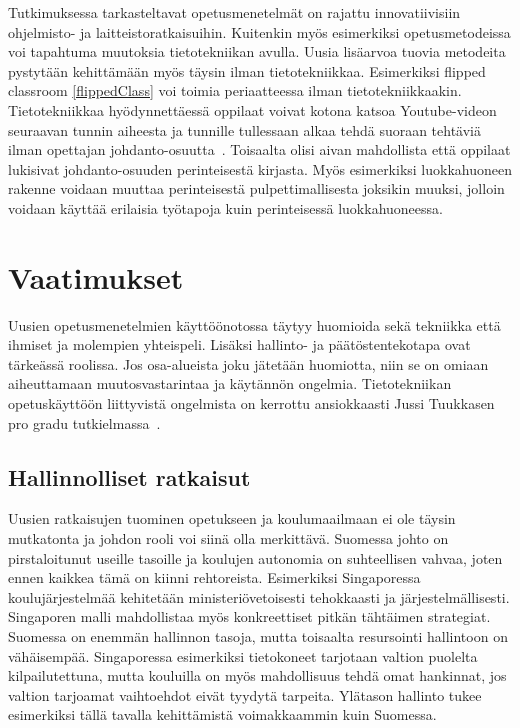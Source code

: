 \documentclass[utf8,bachelor]{gradu3}
\begin{document}
Tutkimuksessa tarkasteltavat opetusmenetelmät on rajattu innovatiivisiin ohjelmisto- ja laitteistoratkaisuihin. Kuitenkin myös esimerkiksi opetusmetodeissa voi tapahtuma muutoksia tietotekniikan avulla. Uusia lisäarvoa tuovia metodeita pystytään kehittämään myös täysin ilman tietotekniikkaa. Esimerkiksi flipped classroom \ref{flippedClass} voi toimia periaatteessa ilman tietotekniikkaakin. Tietotekniikkaa hyödynnettäessä oppilaat voivat kotona katsoa Youtube-videon seuraavan tunnin aiheesta ja tunnille tullessaan alkaa tehdä suoraan tehtäviä ilman opettajan johdanto-osuutta~\parencite[][]{flipped}. Toisaalta olisi aivan mahdollista että oppilaat lukisivat johdanto-osuuden perinteisestä kirjasta. Myös esimerkiksi luokkahuoneen rakenne voidaan muuttaa perinteisestä pulpettimallisesta joksikin muuksi, jolloin voidaan käyttää erilaisia työtapoja kuin perinteisessä luokkahuoneessa.

\section{Vaatimukset}
Uusien opetusmenetelmien käyttöönotossa täytyy huomioida sekä tekniikka että ihmiset ja molempien yhteispeli. Lisäksi hallinto- ja päätöstentekotapa ovat tärkeässä roolissa. Jos osa-alueista joku jätetään huomiotta, niin se on omiaan aiheuttamaan muutosvastarintaa ja käytännön ongelmia. Tietotekniikan opetuskäyttöön liittyvistä ongelmista on kerrottu ansiokkaasti Jussi Tuukkasen pro gradu tutkielmassa~\parencite[][s. 5-30]{kemia}.

\subsection{Hallinnolliset ratkaisut}
Uusien ratkaisujen tuominen opetukseen ja koulumaailmaan ei ole täysin mutkatonta ja johdon rooli voi siinä olla merkittävä. Suomessa johto on pirstaloitunut useille tasoille ja koulujen autonomia on suhteellisen vahvaa, joten ennen kaikkea tämä on kiinni rehtoreista. Esimerkiksi Singaporessa koulujärjestelmää kehitetään ministeriövetoisesti tehokkaasti ja järjestelmällisesti. Singaporen malli mahdollistaa myös konkreettiset pitkän tähtäimen strategiat. Suomessa on enemmän hallinnon tasoja, mutta toisaalta resursointi hallintoon on vähäisempää. Singaporessa esimerkiksi tietokoneet tarjotaan valtion puolelta kilpailutettuna, mutta kouluilla on myös mahdollisuus tehdä omat hankinnat, jos valtion tarjoamat vaihtoehdot eivät tyydytä tarpeita. Ylätason hallinto tukee esimerkiksi tällä tavalla kehittämistä voimakkaammin kuin Suomessa.~\parencite[][]{koulunArki}
\end{document}
